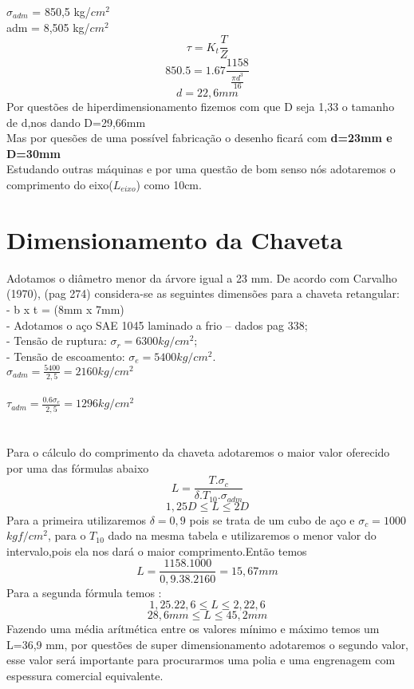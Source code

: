 \documentclass[a4paper, 11pt]{article}
\begin{document}
$\sigma_{adm}$ = 850,5 kg/$cm^2$\\
adm = 8,505 kg/$cm^2$\\
$$\tau=K_t\frac{T}{Z}$$
$$850.5=1.67\frac{1158}{\frac{\pi d^3}{16}}$$
$$d=22,6mm$$
Por quest\~oes de hiperdimensionamento fizemos com que D seja 1,33 o tamanho de d,nos dando D=29,66mm\\
Mas por ques\~oes de uma poss\'ivel fabrica\c{c}\~ao o desenho ficar\'a com \textbf{d=23mm e D=30mm}\\
Estudando outras m\'aquinas e por uma quest\~ao de bom senso n\'os adotaremos o comprimento do eixo($L_{eixo}$) como 10cm.\\
\section{Dimensionamento da Chaveta}
Adotamos o di\^ametro menor da \'arvore igual a 23 mm.
De acordo com Carvalho (1970), (pag 274) considera-se as seguintes
dimens\~oes para a chaveta retangular:\\
- b x t = (8mm x 7mm)\\
- Adotamos o a\c{c}o SAE 1045 laminado a frio – dados pag 338;\\
- Tens\~ao de ruptura: $\sigma_r = 6300 kg/cm^2$;\\
- Tens\~ao de escoamento: $\sigma_e = 5400 kg/cm^2.$\\
$\sigma_{adm}=\frac{5400}{2,5}=2160kg/cm^2$\\\\
$\tau_{adm}=\frac{0.6\sigma_e}{2,5} = 1296 kg/cm^2$\\\\
\\
Para o c\'alculo do comprimento da chaveta adotaremos o maior valor oferecido por uma das f\'ormulas abaixo\\
$$L=\frac{T.\sigma_c}{\delta.T_{10}.\sigma_{adm}}$$
$$1,25D \le L \le 2D$$
Para a primeira utilizaremos $\delta =0,9$ pois se trata de um cubo de a\c{c}o e $\sigma_c=1000$ $ kgf/cm^2$, para o $T_{10}$ dado na mesma tabela e utilizaremos o menor valor do intervalo,pois ela nos dar\'a o maior comprimento.Ent\~ao temos
$$L=\frac{1158.1000}{0,9.38.2160}=15,67mm$$
Para a segunda f\'ormula temos :
$$1,25.22,6\le L \le 2,22,6$$
$$28,6mm\le L \le 45,2 mm$$
Fazendo uma m\'edia ar\'itm\'etica entre os valores m\'inimo e m\'aximo temos um L=36,9 mm, por quest\~oes de super dimensionamento adotaremos o segundo valor, esse valor ser\'a importante para procurarmos uma polia e uma engrenagem  com espessura comercial equivalente. \\
\end{document}
